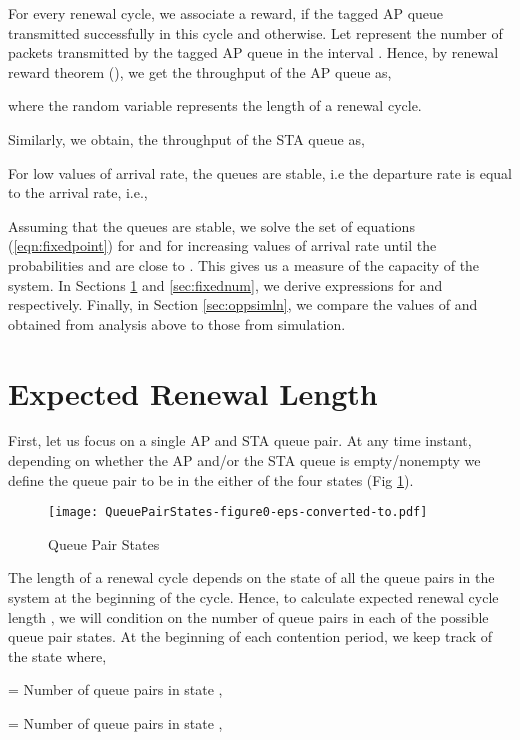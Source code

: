 \documentclass[10pt,conference]{IEEEtran}
\begin{document}
For every renewal cycle, we associate a reward,  if the tagged AP queue transmitted successfully in this cycle and   otherwise. Let  represent the number of packets transmitted by the tagged AP queue
 in the interval . Hence, by renewal reward theorem (\cite{wolf89}), we get the throughput  of the AP queue as,

where the random variable  represents the length of a renewal cycle.

Similarly, we obtain, the throughput  of the STA queue as,
 
 
  For low values of arrival rate, the queues are stable, i.e the departure rate is equal to the arrival rate, i.e.,




Assuming that the queues are stable, we solve the set of equations (\ref{eqn:fixedpoint}) for  and  for increasing values of arrival rate  until the probabilities  and   are close to . 
This gives us a measure of the capacity of the system. 
In Sections \ref{sec:renewal} and \ref{sec:fixednum}, we derive expressions for  and  respectively.
Finally, in Section \ref{sec:oppsimln}, we compare the values of  and  obtained from analysis above to those from simulation.

\section{Expected Renewal Length}
\label{sec:renewal}
 First, let us focus on a single AP and STA queue pair. At any time instant, depending on whether the AP and/or the STA queue is empty/nonempty we define the queue pair to be in the either of the four states  
(Fig \ref{fig:qpairstates}).
       
 \begin{figure}[h]
 \centering
  \texttt{[image: QueuePairStates-figure0-eps-converted-to.pdf]}
 \caption{Queue Pair States}
 \label{fig:qpairstates}
 \end{figure}

  The length of a renewal cycle depends on the state of all the queue pairs in the system at the beginning of the cycle. 
  Hence, to calculate expected renewal cycle length , we will condition on the number of queue pairs in each of the possible queue pair states.
At the beginning of each contention period, we keep track of the state   where,

 = Number of queue pairs in state ,

 = Number of queue pairs in state ,
\end{document}
